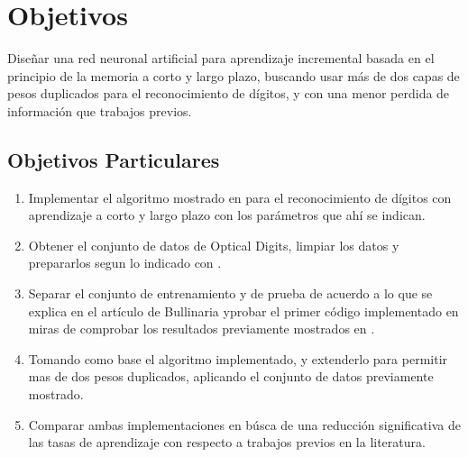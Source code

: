 \section{Objetivos}
    Diseñar una red neuronal artificial para aprendizaje incremental basada en el principio de la memoria a corto y largo plazo, buscando usar más de dos capas de pesos duplicados para el reconocimiento de dígitos, y con una menor perdida de información que trabajos previos.
    \subsection{Objetivos Particulares}
        \begin{enumerate}
            \item Implementar el algoritmo mostrado en \cite{bullinaria2009} para el reconocimiento de dígitos con aprendizaje a corto y largo plazo con los parámetros que ahí se indican.
            \item Obtener el conjunto de datos de Optical Digits, limpiar los datos y prepararlos segun lo indicado con \cite{bullinaria2009}.
            \item Separar el conjunto de entrenamiento y de prueba de acuerdo a lo que se explica en el artículo de Bullinaria yprobar el primer código implementado en miras de comprobar  los resultados previamente mostrados en \cite{bullinaria2009}.
            \item Tomando como base el algoritmo implementado,  y extenderlo para permitir mas de dos pesos duplicados, aplicando el conjunto de datos previamente mostrado.
            \item Comparar ambas implementaciones en búsca de una reducción significativa de las tasas de aprendizaje con respecto a trabajos previos en la literatura.
        \end{enumerate}